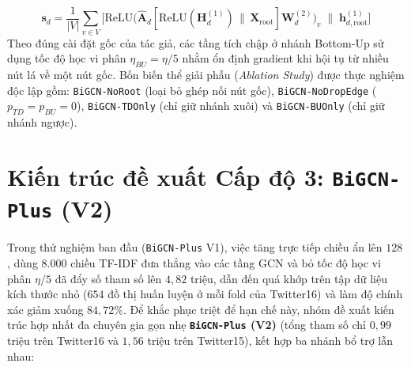 \documentclass[11pt,a4paper]{extreport}
\begin{document}
\begin{enumerate}
    \begin{equation}
        \mathbf{s}_d = \frac{1}{|V|}\sum_{v \in V} \Big[\text{ReLU}\big(\hat{\mathbf{A}}_d[\text{ReLU}(\mathbf{H}_d^{(1)}) \,\|\, \mathbf{X}_{\text{root}}]\mathbf{W}_d^{(2)}\big)_v \;\|\; \mathbf{h}_{d,\text{root}}^{(1)}\Big]
        \label{eq:bigcn-readout}
    \end{equation}
    Theo đúng cài đặt gốc của tác giả, các tầng tích chập ở nhánh Bottom-Up sử dụng tốc độ học vi phân $\eta_{BU} = \eta / 5$ nhằm ổn định gradient khi hội tụ từ nhiều nút lá về một nút gốc. Bốn biến thể giải phẫu (\textit{Ablation Study}) được thực nghiệm độc lập gồm: \texttt{BiGCN-NoRoot} (loại bỏ ghép nối nút gốc), \texttt{BiGCN-NoDropEdge} ($p_{TD}=p_{BU}=0$), \texttt{BiGCN-TDOnly} (chỉ giữ nhánh xuôi) và \texttt{BiGCN-BUOnly} (chỉ giữ nhánh ngược).
\end{enumerate}

\section{Kiến trúc đề xuất Cấp độ 3: \texttt{BiGCN-Plus} (V2)}

Trong thử nghiệm ban đầu (\texttt{BiGCN-Plus} V1), việc tăng trực tiếp chiều ẩn lên $128$, dùng $8.000$ chiều TF-IDF đưa thẳng vào các tầng GCN và bỏ tốc độ học vi phân $\eta/5$ đã đẩy số tham số lên $4{,}82$ triệu, dẫn đến quá khớp trên tập dữ liệu kích thước nhỏ ($654$ đồ thị huấn luyện ở mỗi fold của Twitter16) và làm độ chính xác giảm xuống $84{,}72\%$. Để khắc phục triệt để hạn chế này, nhóm đề xuất kiến trúc hợp nhất đa chuyên gia gọn nhẹ \textbf{\texttt{BiGCN-Plus} (V2)} (tổng tham số chỉ $0{,}99$ triệu trên Twitter16 và $1{,}56$ triệu trên Twitter15), kết hợp ba nhánh bổ trợ lẫn nhau:
\end{document}
